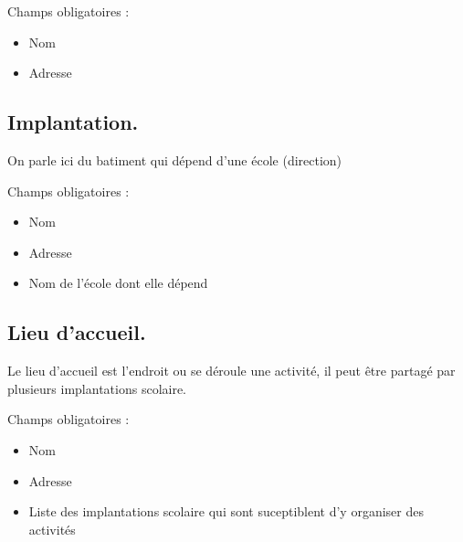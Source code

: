 \documentclass[letterpaper,10pt,english]{sphinxmanual}
\begin{document}
Champs obligatoires :
\begin{itemize}
\item {} 
Nom

\item {} 
Adresse

\end{itemize}


\subsection{Implantation.}
\label{checklist:implantation}
On parle ici du batiment qui dépend d'une école (direction)

Champs obligatoires :
\begin{itemize}
\item {} 
Nom

\item {} 
Adresse

\item {} 
Nom de l'école dont elle dépend

\end{itemize}


\subsection{Lieu d'accueil.}
\label{checklist:lieu-d-accueil}
Le lieu d'accueil est l'endroit ou se déroule une activité, il peut être partagé par plusieurs implantations scolaire.

Champs obligatoires :
\begin{itemize}
\item {} 
Nom

\item {} 
Adresse

\item {} 
Liste des implantations scolaire qui sont suceptiblent d'y organiser des activités

\end{itemize}
\end{document}
